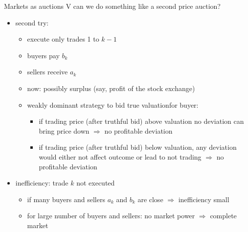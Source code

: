 \documentclass[bigger]{beamer}
\newcommand{\Ra}{\Rightarrow} \newcommand{\ra}{\rightarrow} \newcommand{\Lra}{\Leftrightarrow}
\begin{document}
\begin{frame}[label={sec:org105a2b2}]{Markets as auctions V}
can we do something like a second price auction?
\begin{itemize}
\item second try:
\begin{itemize}
\item execute only trades 1 to \(k-1\)
\item buyers pay \(b_k\)
\item sellers receive \(a_k\)
\item now: possibly surplus (say, profit of the stock exchange)
\item weakly dominant strategy to bid true valuation\linebreak for buyer:
\begin{itemize}
\item if trading price (after truthful bid) above valuation no deviation can bring price down \(\Ra\) no profitable deviation
\item if trading price (after truthful bid) below valuation, any deviation would either not affect outcome or lead to not trading \(\Ra\) no profitable deviation
\end{itemize}
\end{itemize}
\item inefficiency: trade \(k\) not executed
\begin{itemize}
\item if many buyers and sellers \(a_k\) and \(b_k\) are close \(\Ra\) inefficiency small
\item for large number of buyers and sellers: no market power \(\Ra\) complete market
\end{itemize}
\end{itemize}
\end{frame}
\end{document}
